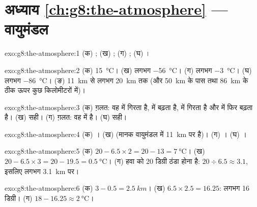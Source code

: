 \section*{अध्याय \ref{ch:g8:the-atmosphere} --- वायुमंडल}

\begin{solution}{exo:g8:the-atmosphere:1}
(क) ; (ख) ; (ग) ; (घ) ।
\end{solution}

\begin{solution}{exo:g8:the-atmosphere:2}
(क) \qty{15}{\degreeCelsius}। (ख) लगभग \qty{-56}{\degreeCelsius}।
(ग) लगभग \qty{-3}{\degreeCelsius}। (घ) लगभग \qty{-86}{\degreeCelsius}।
(ङ) \qty{11}{km} से लगभग \qty{20}{km} तक (और \qty{50}{km} के पास तथा
\qty{86}{km} के ठीक ऊपर कुछ किलोमीटरों में)।
\end{solution}

\begin{solution}{exo:g8:the-atmosphere:3}
(क) ग़लत: वह  में गिरता है,  में बढ़ता है,  में गिरता है
और  में फिर बढ़ता है। (ख) सही। (ग) ग़लत: वह  में है। (घ) सही।
\end{solution}

\begin{solution}{exo:g8:the-atmosphere:4}
(क) । (ख)  (मानक वायुमंडल में  \qty{11}{km} पर है)।
(ग) । (घ) ।
\end{solution}

\begin{solution}{exo:g8:the-atmosphere:5}
(क) $20 - 6.5 \times 2 = 20 - 13 = \qty{7}{\degreeCelsius}$। (ख) $20 -
6.5 \times 3 = 20 - 19.5 = \qty{0.5}{\degreeCelsius}$। (ग) हवा को 20 डिग्री ठंडा होना
है: $20 \div 6.5 \approx 3.1$, इसलिए लगभग
\qty{3.1}{km} पर।
\end{solution}

\begin{solution}{exo:g8:the-atmosphere:6}
(क) $3 - 0.5 = \qty{2.5}{km}$। (ख) $6.5 \times 2.5 = 16.25$: लगभग 16
डिग्री। (ग) $18 - 16.25 \approx \qty{2}{\degreeCelsius}$।
\end{solution}

